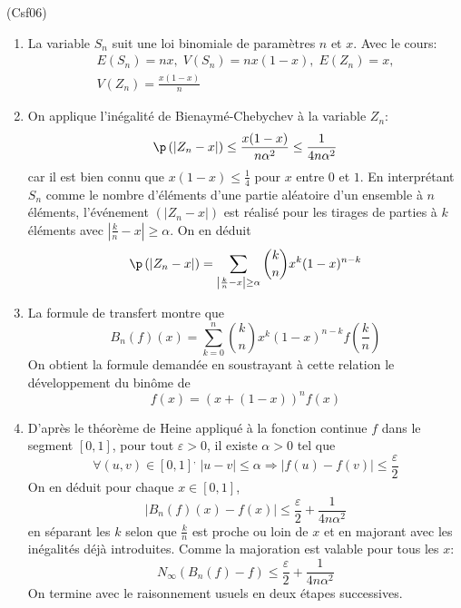 \begin{tiny}(Csf06)\end{tiny}
\begin{enumerate}
  \item La variable $S_n$ suit une loi binomiale de paramètres $n$ et $x$. Avec le cours:
\begin{multline*}
E(S_n)=nx,\; V(S_n)=nx(1-x),\; E(Z_n)=x,\\ V(Z_n) = \frac{x(1-x)}{n}  
\end{multline*}

  \item On applique l'inégalité de Bienaymé-Chebychev à la variable $Z_n$:
\begin{displaymath}
\p\left( \left|Z_n -x\right|\right)\leq \frac{x(1-x)}{n\alpha^2}\leq \frac{1}{4n\alpha^2} 
\end{displaymath}
car il est bien connu que $x(1-x)\leq\frac{1}{4}$ pour $x$ entre $0$ et $1$. En interprétant $S_n$ comme le nombre d'éléments d'une partie aléatoire d'un ensemble à $n$ éléments, l'événement $(\left|Z_n -x\right|)$ est réalisé pour les tirages de parties à $k$ éléments avec $\left|\frac{k}{n}-x\right|\geq \alpha$. On en déduit
\begin{displaymath}
\p\left( \left|Z_n -x\right|\right)
= \sum_{\left|\frac{k}{n}-x\right|\geq \alpha} \binom{k}{n}x^k (1-x)^{n-k}
\end{displaymath}

  \item La formule de transfert montre que
\begin{displaymath}
B_n(f)(x) 
= \sum_{k=0}^{n} \binom{k}{n}x^k (1-x)^{n-k}f(\frac{k}{n})    
\end{displaymath}
On obtient la formule demandée en soustrayant à cette relation le développement du binôme de
\begin{displaymath}
  f(x) = \left( x+(1-x)\right)^n f(x) 
\end{displaymath}

  \item D'après le théorème de Heine appliqué à la fonction continue $f$ dans le segment $[0,1]$, pour tout $\varepsilon >0$, il existe $\alpha >0$ tel que
\begin{displaymath}
  \forall (u,v)\in[0,1]^,\;
|u-v| \leq \alpha \Rightarrow |f(u)-f(v)|\leq \frac{\varepsilon}{2}
\end{displaymath}
On en déduit pour chaque $x\in [0,1]$,
\begin{displaymath}
\left|B_n(f)(x) -f(x)\right| \leq \frac{\varepsilon}{2}+ \frac{1}{4n\alpha^2} 
\end{displaymath}
en séparant les $k$ selon que $\frac{k}{n}$ est proche ou loin de $x$ et en majorant avec les inégalités déjà introduites.\newline
Comme la majoration est valable pour tous les $x$:
\begin{displaymath}
  N_{\infty}\left( B_n(f) -f\right) \leq \frac{\varepsilon}{2}+ \frac{1}{4n\alpha^2} 
\end{displaymath}
On termine avec le raisonnement usuels en deux étapes successives.
\end{enumerate}
